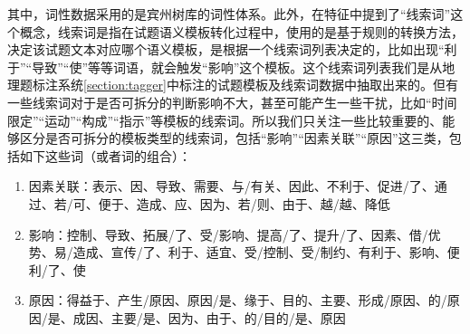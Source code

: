 \documentclass[master, winfont]{njuthesis}
\begin{document}
其中，词性数据采用的是宾州树库的词性体系。此外，在特征中提到了“线索词”这个概念，线索词是指在试题语义模板转化过程中，使用的是基于规则的转换方法，决定该试题文本对应哪个语义模板，是根据一个线索词列表决定的，比如出现“利于”“导致”“使”等等词语，就会触发“影响”这个模板。这个线索词列表我们是从地理题标注系统\ref{section:tagger}中标注的试题模板及线索词数据中抽取出来的。但有一些线索词对于是否可拆分的判断影响不大，甚至可能产生一些干扰，比如“时间限定”“运动”“构成”“指示”等模板的线索词。所以我们只关注一些比较重要的、能够区分是否可拆分的模板类型的线索词，包括“影响”“因素关联”“原因”这三类，包括如下这些词（或者词的组合）：
\begin{enumerate}
	\item 因素关联：表示、因、导致、需要、与/有关、因此、不利于、促进/了、通过、若/可、便于、造成、应、因为、若/则、由于、越/越、降低
	\item 影响：控制、导致、拓展/了、受/影响、提高/了、提升/了、因素、借/优势、易/造成、宣传/了、利于、适宜、受/控制、受/制约、有利于、影响、便利/了、使
	\item 原因：得益于、产生/原因、原因/是、缘于、目的、主要、形成/原因、的/原因/是、成因、主要/是、因为、由于、的/目的/是、原因
\end{enumerate}
\end{document}
